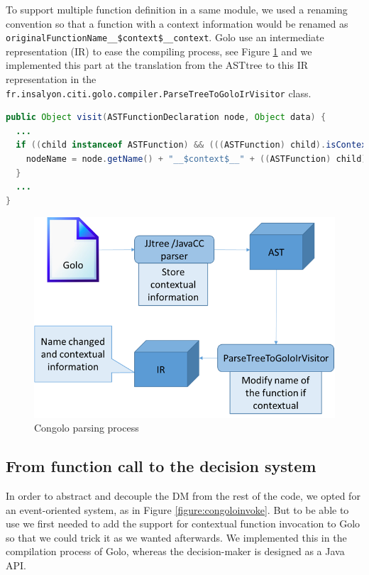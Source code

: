 \documentclass[a4paper]{article}
\begin{document}
To support multiple function definition in a same module, we used a renaming convention so that a function with a context information would be renamed as \lstinline|originalFunctionName__$context$__context|.  Golo use an intermediate representation (IR) to ease the compiling process, see Figure \ref{figure:congoloparsing} and we implemented this part at the translation from the ASTtree to this IR representation in the \lstinline|fr.insalyon.citi.golo.compiler.ParseTreeToGoloIrVisitor| class.

\begin{lstlisting}[float, language=Java, caption=IR modification - ParseTreeToGoloIrVisitor.java, label={listing:implastfunction}]
public Object visit(ASTFunctionDeclaration node, Object data) {
  ...
  if ((child instanceof ASTFunction) && (((ASTFunction) child).isContextual())) {
    nodeName = node.getName() + "__$context$__" + ((ASTFunction) child).getContexts().get(0);
  }
  ...
}
\end{lstlisting}

\begin{center}
\begin{figure}
\centering
\includegraphics[width=0.9\columnwidth]{images/congolo_parse.png}
\caption{Congolo parsing process}
\label{figure:congoloparsing}
\end{figure}
\end{center}

\subsection{From function call to the decision system}

In order to abstract and decouple the DM from the rest of the code, we opted for an event-oriented system, as in Figure \ref{figure:congoloinvoke}. But to be able to use we first needed to add the support for contextual function invocation to Golo so that we could trick it as we wanted afterwards. We implemented this in the compilation process of Golo, whereas the decision-maker is designed as a Java API.
\end{document}
